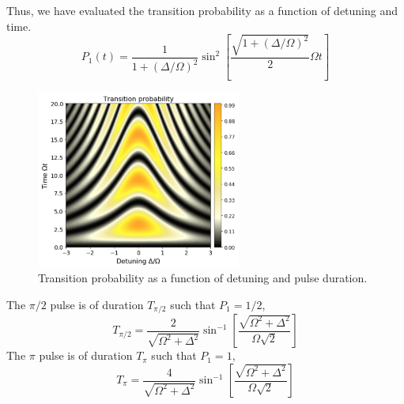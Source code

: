 \documentclass[aps,prl,onecolumn,notitlepage,showpacs,floatfix,superscriptaddress]{revtex4-1}
\begin{document}
Thus, we have evaluated the transition probability as a function of detuning and time. 
\begin{equation}
P_1 (t) = \dfrac{1}{1+(\Delta/\Omega)^2} \sin^2 \left[\dfrac{\sqrt{1+(\Delta/\Omega)^2}}{2} \Omega t \right]
\end{equation}
\begin{figure}[hbtp]
\centering
\includegraphics[width=0.6\textwidth]{Rabi.png}
\caption{Transition probability as a function of detuning and pulse duration.}
\end{figure}

The $\pi/2$ pulse is of duration $T_{\pi/2}$ such that $P_1=1/2$,
\begin{equation}
T_{\pi/2} = \dfrac{2}{\sqrt{\Omega^2+\Delta^2}} \sin^{-1} \left[\dfrac{\sqrt{\Omega^2+\Delta^2}}{\Omega \sqrt{2}} \right]
\end{equation}
The $\pi$ pulse is of duration $T_{\pi}$ such that $P_1=1$,
\begin{equation}
T_{\pi} = \dfrac{4}{\sqrt{\Omega^2+\Delta^2}} \sin^{-1} \left[\dfrac{\sqrt{\Omega^2+\Delta^2}}{\Omega \sqrt{2}} \right]
\end{equation}
\end{document}
